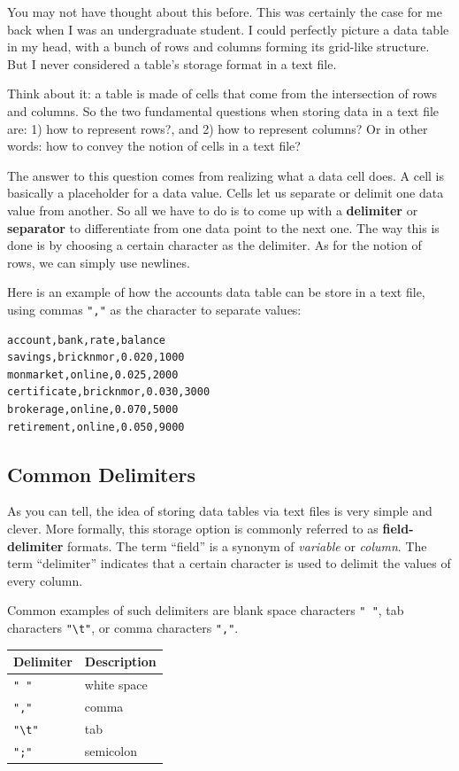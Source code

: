 \documentclass[
]{book}
\begin{document}
You may not have thought about this before. This was certainly the case for
me back when I was an undergraduate student. I could perfectly picture a data
table in my head, with a bunch of rows and columns forming its grid-like
structure. But I never considered a table's storage format in a text file.

Think about it: a table is made of cells that come from the intersection of
rows and columns. So the two fundamental questions when storing data in a text
file are: 1) how to represent rows?, and 2) how to represent columns? Or in
other words: how to convey the notion of cells in a text file?

The answer to this question comes from realizing what a data cell does. A
cell is basically a placeholder for a data value. Cells let us separate or
delimit one data value from another. So all we have to do is to come up with
a \textbf{delimiter} or \textbf{separator} to differentiate from one data point to the
next one. The way this is done is by choosing a certain character as the
delimiter. As for the notion of rows, we can simply use newlines.

Here is an example of how the accounts data table can be store in a
text file, using commas \texttt{","} as the character to separate values:

\begin{verbatim}
account,bank,rate,balance
savings,bricknmor,0.020,1000
monmarket,online,0.025,2000
certificate,bricknmor,0.030,3000
brokerage,online,0.070,5000
retirement,online,0.050,9000
\end{verbatim}

\hypertarget{common-delimiters}{%
\subsection{Common Delimiters}\label{common-delimiters}}

As you can tell, the idea of storing data tables via text files is very simple
and clever. More formally, this storage option is commonly referred to as
\textbf{field-delimiter} formats. The term ``field'' is a synonym of \emph{variable} or
\emph{column}. The term ``delimiter'' indicates that a certain character is used to
delimit the values of every column.

Common examples of such delimiters are blank space characters \texttt{"\ "}, tab
characters \texttt{"\textbackslash{}t"}, or comma characters \texttt{","}.

\begin{longtable}[]{@{}ll@{}}
\toprule()
Delimiter & Description \\
\midrule()
\endhead
\texttt{"\ "} & white space \\
\texttt{","} & comma \\
\texttt{"\textbackslash{}t"} & tab \\
\texttt{";"} & semicolon \\
\bottomrule()
\end{longtable}
\end{document}
